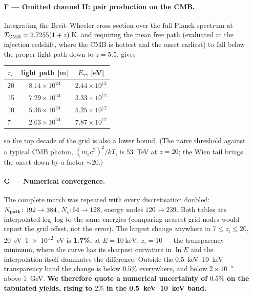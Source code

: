 \documentclass[11pt,a4paper]{article}
\begin{document}
\paragraph{F --- Omitted channel II: pair production on the CMB.}
Integrating the Breit--Wheeler cross section
\citep{breit34}\citep[][\S11-3]{jauch76} over the full Planck spectrum at
$T_{\rm CMB}=2.7255(1+z)\,$K, and requiring the mean free path (evaluated at
the injection redshift, where the CMB is hottest and the onset earliest) to
fall below the proper light path down to $z=5.5$, gives
\begin{center}
\begin{tabular}{lcc}
\toprule
$z_i$ & light path [m] & $E_{\gamma\gamma}$ [eV] \\
\midrule
20 & $8.14\times10^{24}$ & $2.44\times10^{12}$ \\
15 & $7.29\times10^{24}$ & $3.33\times10^{12}$ \\
10 & $5.36\times10^{24}$ & $5.25\times10^{12}$ \\
 7 & $2.63\times10^{24}$ & $7.87\times10^{12}$ \\
\bottomrule
\end{tabular}
\end{center}
so the top decade of the grid is also a lower bound. (The naive threshold
against a typical CMB photon, $(m_ec^2)^2/kT$, is \SI{53}{\tera\electronvolt}
at $z=20$; the Wien tail brings the onset down by a factor $\sim20$.)

\paragraph{G --- Numerical convergence.}
The complete march was repeated with every discretisation doubled:
$N_{\rm path}\!: 192\to384$, $N_s\!: 64\to128$, energy nodes $120\to239$.
Both tables are interpolated log--log to the same energies (comparing nearest
grid nodes would report the grid offset, not the error). The largest change
anywhere in $7\le z_i\le20$, \SIrange{20}{1e12}{\electronvolt} is
\textbf{1.7\%}, at $E=\SI{10}{\kilo\electronvolt}$, $z_i=10$ --- the
transparency minimum, where the curve has its sharpest curvature in $\ln E$
and the interpolation itself dominates the difference. Outside the
\SIrange{0.5}{10}{\kilo\electronvolt} transparency band the change is below
$\mathbf{0.5\%}$ everywhere, and below $2\times10^{-5}$ above
\SI{1}{\giga\electronvolt}. \textbf{We therefore quote a numerical
uncertainty of $0.5\%$ on the tabulated yields, rising to $2\%$ in the
\SIrange{0.5}{10}{\kilo\electronvolt} band.}
\end{document}
